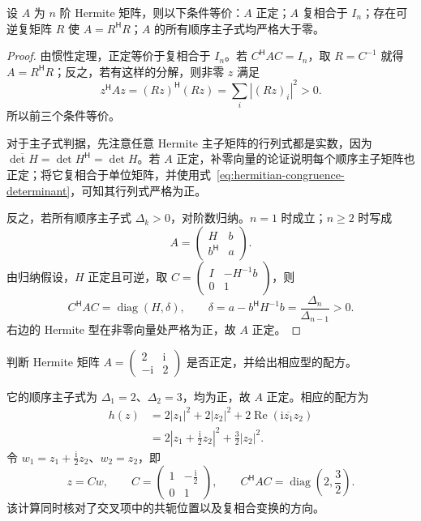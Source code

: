 \begin{theorem}
\label{thm:hermitian-positive-definite-criteria}
设 $A$ 为 $n$ 阶 Hermite 矩阵，则以下条件等价：$A$ 正定；$A$ 复相合于 $I_n$；存在可逆复矩阵 $R$ 使 $A=R^{\mathsf H}R$；$A$ 的所有顺序主子式均严格大于零。
\end{theorem}
\begin{proof}
由惯性定理，正定等价于复相合于 $I_n$。若 $C^{\mathsf H}AC=I_n$，取 $R=C^{-1}$ 就得 $A=R^{\mathsf H}R$；反之，若有这样的分解，则非零 $z$ 满足
\[
    z^{\mathsf H}Az=(Rz)^{\mathsf H}(Rz)
       =\sum_i|(Rz)_i|^2>0.
\]
所以前三个条件等价。

对于主子式判据，先注意任意 Hermite 主子矩阵的行列式都是实数，因为 $\overline{\det H}=\det H^{\mathsf H}=\det H$。若 $A$ 正定，补零向量的论证说明每个顺序主子矩阵也正定；将它复相合于单位矩阵，并使用式~\eqref{eq:hermitian-congruence-determinant}，可知其行列式严格为正。

反之，若所有顺序主子式 $\Delta_k>0$，对阶数归纳。$n=1$ 时成立；$n\geq2$ 时写成
\[
    A=\begin{pmatrix}H&b\\b^{\mathsf H}&a\end{pmatrix}.
\]
由归纳假设，$H$ 正定且可逆，取 $C=\begin{pmatrix}I&-H^{-1}b\\0&1\end{pmatrix}$，则
\[
    C^{\mathsf H}AC=\operatorname{diag}(H,\delta),
    \qquad \delta=a-b^{\mathsf H}H^{-1}b
                  =\frac{\Delta_n}{\Delta_{n-1}}>0.
\]
右边的 Hermite 型在非零向量处严格为正，故 $A$ 正定。
\end{proof}

\begin{example}
\label{ex:hermitian-positive-definite}
判断 Hermite 矩阵 $A=\begin{pmatrix}2&\mathrm i\\-\mathrm i&2\end{pmatrix}$ 是否正定，并给出相应型的配方。
\end{example}
\begin{solve}
它的顺序主子式为 $\Delta_1=2$、$\Delta_2=3$，均为正，故 $A$ 正定。相应的配方为
\[
\begin{aligned}
    h(z)&=2|z_1|^2+2|z_2|^2
             +2\operatorname{Re}(\mathrm i\overline{z_1}z_2)\\
        &=2\left|z_1+\frac{\mathrm i}{2}z_2\right|^2
             +\frac32|z_2|^2.
\end{aligned}
\]
令 $w_1=z_1+\frac{\mathrm i}{2}z_2$、$w_2=z_2$，即
\[
    z=Cw,\qquad C=\begin{pmatrix}1&-\frac{\mathrm i}{2}\\0&1\end{pmatrix},
    \qquad C^{\mathsf H}AC=\operatorname{diag}\left(2,\frac32\right).
\]
该计算同时核对了交叉项中的共轭位置以及复相合变换的方向。
\end{solve}






